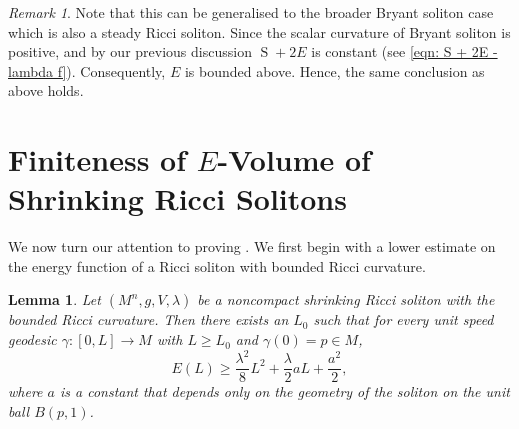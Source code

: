 \documentclass{amsart}
\DeclareMathOperator*{\scalar}{S}
\theoremstyle{plain}
\theoremstyle{plain}
\theoremstyle{plain}
\theoremstyle{plain}
\newtheorem{lemma}{Lemma}
\theoremstyle{remark}
\newtheorem{remark}{Remark}
\begin{document}
\begin{remark}
Note that this can be generalised to the broader Bryant soliton case which is also a steady Ricci soliton.
Since the scalar curvature of Bryant soliton is  positive,  and  by our previous discussion 
$\scalar + 2E$ is constant (see \cref{eqn: S + 2E - lambda f}). Consequently, $E$ is bounded above. 
Hence,  the same conclusion as above holds.
\end{remark}





\section{Finiteness of $E$-Volume of Shrinking Ricci Solitons}\label{finite-volume}

We now turn our attention to proving .
We first begin with a lower estimate on the energy function of a Ricci soliton with bounded Ricci curvature.
\begin{lemma}
	Let $(M^n,g,V,\lambda)$ be a noncompact shrinking Ricci soliton with the bounded Ricci curvature. 
Then  there exists an $L_0$ such that for every 
	unit speed geodesic $\gamma: [0,L] \to M $ with $L\geq L_0$ and 
	$\gamma (0) = p \in M $,
	$$ E (L) \geq \frac{\lambda^2}{8} L^2 + \frac{\lambda}{2} a L + \frac{a^2}{2},  $$
	where $a$ is a constant that depends only on the geometry of the soliton on the unit ball $B(p,1)$.
\end{lemma}
\end{document}
